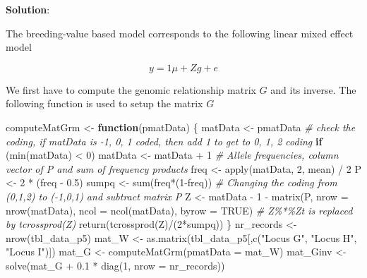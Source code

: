 \documentclass[
]{article}
\newenvironment{Shaded}{\begin{snugshade}}{\end{snugshade}}
\newcommand{\AttributeTok}[1]{\textcolor[rgb]{0.77,0.63,0.00}{#1}}
\newcommand{\CommentTok}[1]{\textcolor[rgb]{0.56,0.35,0.01}{\textit{#1}}}
\newcommand{\ConstantTok}[1]{\textcolor[rgb]{0.00,0.00,0.00}{#1}}
\newcommand{\ControlFlowTok}[1]{\textcolor[rgb]{0.13,0.29,0.53}{\textbf{#1}}}
\newcommand{\DecValTok}[1]{\textcolor[rgb]{0.00,0.00,0.81}{#1}}
\newcommand{\FloatTok}[1]{\textcolor[rgb]{0.00,0.00,0.81}{#1}}
\newcommand{\FunctionTok}[1]{\textcolor[rgb]{0.00,0.00,0.00}{#1}}
\newcommand{\NormalTok}[1]{#1}
\newcommand{\OtherTok}[1]{\textcolor[rgb]{0.56,0.35,0.01}{#1}}
\newcommand{\SpecialCharTok}[1]{\textcolor[rgb]{0.00,0.00,0.00}{#1}}
\newcommand{\StringTok}[1]{\textcolor[rgb]{0.31,0.60,0.02}{#1}}
\newcommand{\solstart}
{\vspace{3ex}\textbf{Solution}:}
\begin{document}
\solstart

The breeding-value based model corresponds to the following linear mixed
effect model

\[y = 1\mu + Zg + e\]

We first have to compute the genomic relationship matrix \(G\) and its
inverse. The following function is used to setup the matrix \(G\)

\begin{Shaded}
\begin{Highlighting}[]
\NormalTok{computeMatGrm }\OtherTok{\textless{}{-}} \ControlFlowTok{function}\NormalTok{(pmatData) \{}
\NormalTok{  matData }\OtherTok{\textless{}{-}}\NormalTok{ pmatData}
  \CommentTok{\# check the coding, if matData is {-}1, 0, 1 coded, then add 1 to get to 0, 1, 2 coding}
  \ControlFlowTok{if}\NormalTok{ (}\FunctionTok{min}\NormalTok{(matData) }\SpecialCharTok{\textless{}} \DecValTok{0}\NormalTok{) matData }\OtherTok{\textless{}{-}}\NormalTok{ matData }\SpecialCharTok{+} \DecValTok{1}
  \CommentTok{\# Allele frequencies, column vector of P and sum of frequency products}
\NormalTok{  freq }\OtherTok{\textless{}{-}} \FunctionTok{apply}\NormalTok{(matData, }\DecValTok{2}\NormalTok{, mean) }\SpecialCharTok{/} \DecValTok{2}
\NormalTok{  P }\OtherTok{\textless{}{-}} \DecValTok{2} \SpecialCharTok{*}\NormalTok{ (freq }\SpecialCharTok{{-}} \FloatTok{0.5}\NormalTok{)}
\NormalTok{  sumpq }\OtherTok{\textless{}{-}} \FunctionTok{sum}\NormalTok{(freq}\SpecialCharTok{*}\NormalTok{(}\DecValTok{1}\SpecialCharTok{{-}}\NormalTok{freq))}
  \CommentTok{\# Changing the coding from (0,1,2) to ({-}1,0,1) and subtract matrix P}
\NormalTok{  Z }\OtherTok{\textless{}{-}}\NormalTok{ matData }\SpecialCharTok{{-}} \DecValTok{1} \SpecialCharTok{{-}} \FunctionTok{matrix}\NormalTok{(P, }\AttributeTok{nrow =} \FunctionTok{nrow}\NormalTok{(matData), }
                             \AttributeTok{ncol =} \FunctionTok{ncol}\NormalTok{(matData), }
                             \AttributeTok{byrow =} \ConstantTok{TRUE}\NormalTok{)}
  \CommentTok{\# Z\%*\%Zt is replaced by tcrossprod(Z)}
  \FunctionTok{return}\NormalTok{(}\FunctionTok{tcrossprod}\NormalTok{(Z)}\SpecialCharTok{/}\NormalTok{(}\DecValTok{2}\SpecialCharTok{*}\NormalTok{sumpq))}
\NormalTok{\}}
\NormalTok{nr\_records }\OtherTok{\textless{}{-}} \FunctionTok{nrow}\NormalTok{(tbl\_data\_p5)}
\NormalTok{mat\_W }\OtherTok{\textless{}{-}} \FunctionTok{as.matrix}\NormalTok{(tbl\_data\_p5[,}\FunctionTok{c}\NormalTok{(}\StringTok{"Locus G"}\NormalTok{, }\StringTok{"Locus H"}\NormalTok{, }\StringTok{"Locus I"}\NormalTok{)])}
\NormalTok{mat\_G }\OtherTok{\textless{}{-}} \FunctionTok{computeMatGrm}\NormalTok{(}\AttributeTok{pmatData =}\NormalTok{ mat\_W)}
\NormalTok{mat\_Ginv }\OtherTok{\textless{}{-}} \FunctionTok{solve}\NormalTok{(mat\_G }\SpecialCharTok{+} \FloatTok{0.1} \SpecialCharTok{*} \FunctionTok{diag}\NormalTok{(}\DecValTok{1}\NormalTok{, }\AttributeTok{nrow =}\NormalTok{ nr\_records))}
\end{Highlighting}
\end{Shaded}
\end{document}
